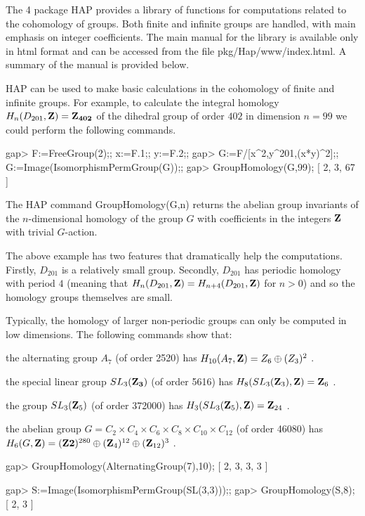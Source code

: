 
The {\GAP} 4 package {\sf HAP} provides a library of functions for computations related to the cohomology of groups. Both finite and infinite groups are handled, with main emphasis on integer coefficients.
 The main manual for the library is available only in html format and can be accessed from the file pkg/Hap/www/index.html. A summary of the manual is provided below.

HAP can be used to make basic calculations in the cohomology of finite and infinite groups. For example, to calculate the integral homology 
$H_n(D_{201},\bf Z) ={\bf Z}_{402}$
of the dihedral group of order $402$ in dimension $n=99$
we could perform the following commands. 

\beginexample
gap> F:=FreeGroup(2);; x:=F.1;; y:=F.2;;
gap> G:=F/[x^2,y^201,(x*y)^2];; G:=Image(IsomorphismPermGroup(G));;
gap> GroupHomology(G,99);
[ 2, 3, 67 ]
\endexample

The HAP command {\sf GroupHomology(G,n)} returns the abelian 
group invariants of the $n$-dimensional homology of the group $G$ with coefficients in the integers $\bf Z$ with trivial $G$-action. 

The above example has two features that dramatically help the computations. 
Firstly, $D_{201}$ is a relatively small group. Secondly, 
$D_{201}$ has periodic homology with period $4$ (meaning that 
$H_n(D_{201},{\bf Z}) = H_{n+4}(D_{201},{\bf Z})$ for $n>0$)
and so the homology groups themselves are small. 

Typically, the homology of larger non-periodic groups can only be computed in low dimensions. The following commands show that:

 the alternating group $A_7$ (of order 2520) has $H_{10}(A_7,{\bf Z}) = 
Z_6\oplus (Z_3)^2$ .  

 the special linear group $SL_3({\bf Z_3})$ (of order 5616) has 
$H_8(SL_3({\bf Z}_3),{\bf Z})={\bf Z}_6$ .

 the group $SL_3({\bf Z}_5)$ (of order 372000) has 
$H_3(SL_3({\bf Z}_5),{\bf Z}) = {\bf Z}_{24}$ .
	        
 the abelian group $G=C_2\times C_4\times C_6\times C_8\times C_{10} 
\times C_{12}$ (of order 46080) has $H_6(G,{\bf Z})=({\bf Z2})^{280}
\oplus({\bf Z}_4)^{12}\oplus ({\bf Z}_{12})^3$ .

\beginexample
gap> GroupHomology(AlternatingGroup(7),10);
[ 2, 3, 3, 3 ]

gap> S:=Image(IsomorphismPermGroup(SL(3,3)));;
gap> GroupHomology(S,8);
[ 2, 3 ]

